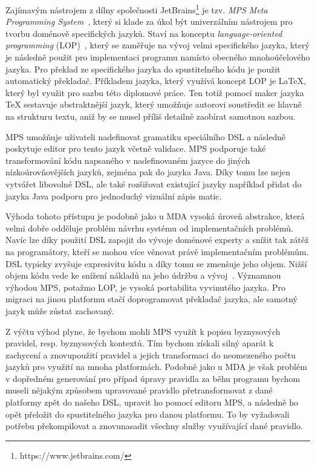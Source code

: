 Zajímavým nástrojem z dílny společnosti JetBrains\footnote{https://www.jetbrains.com/}
je tzv. \textit{MPS \textendash\xspace Meta Programming System}~\cite{jetbrainsmps}, který si klade za úkol být univerzálním
nástrojem pro tvorbu doménově specifických jazyků. Staví na konceptu \textit{language-oriented
programming} (\gls{LOP})~\cite{ward1994language}, který se zaměřuje na vývoj velmi specifického jazyka,
který je následně použit pro implementaci programu namísto obecného mnohoúčelového jazyka. Pro překlad
ze specifického jazyka do spustitelného kódu je použit automatický překladač. Příkladem jazyka, který využívá koncept \gls{LOP}
je \LaTeX\xspace, který byl využit pro sazbu této diplomové práce. Ten totiž pomocí maker jazyka \TeX\xspace
sestavuje abstraktnější jazyk, který umožňuje autorovi soustředit se hlavně na strukturu textu, aniž by
se musel příliš detailně zaobírat samotnou sazbou.

MPS umožňuje uživateli nadefinovat gramatiku speciálního \gls{DSL} a následně poskytuje
editor pro tento jazyk včetně validace. MPS podporuje také transformování kódu napsaného
v nadefinovaném jazyce do jiných nízkoúrovňovějších jazyků, zejména pak do jazyka Java.
Díky tomu lze nejen vytvářet libovolné \gls{DSL}, ale také rozšiřovat existující
jazyky \textendash například přidat do jazyka Java podporu pro jednoduchý vizuální zápis matic.

Výhoda tohoto přístupu je podobně jako u \gls{MDA} vysoká úroveň abstrakce, která
velmi dobře odděluje problém návrhu systému od implementačních problémů.
Navíc lze díky použití \gls{DSL} zapojit do vývoje doménové experty a snížit tak
zátěž na programátory, kteří se mohou více věnovat právě implementačním problémům.
\gls{DSL} typicky zvyšuje expresivitu kódu a díky tomu se zmenšuje jeho objem.
Nižší objem kódu vede ke snížení nákladů na jeho údržbu a vývoj~\cite{littman1987mental}\cite{soloway1986empirical}.
Významnou výhodou MPS, potažmo \gls{LOP}, je vysoká portabilita vyvinutého jazyka.
Pro migraci na jinou platformu stačí doprogramovat překladač jazyka, ale
samotný jazyk může zůstat zachovaný.

Z výčtu výhod plyne, že bychom mohli MPS využít k popisu byznysových pravidel,
resp. byznysových kontextů. Tím bychom získali silný aparát k zachycení a
znovupoužití pravidel a jejich transformaci do neomezeného počtu jazyků pro
využití na mnoha platformách. Podobně jako u \gls{MDA} je však problém v dopředném
generování \textendash pro případ úpravy pravidla za běhu programu bychom museli
nějakým způsobem upravované pravidlo přetransformovat z dané platformy zpět
do našeho \gls{DSL}, upravit ho pomocí editoru MPS, a následně ho opět přeložit
do spustitelného jazyka pro danou platformu. To by vyžadovali potřebu překompilovat
a znovunasadit všechny služby využívající dané pravidlo.

